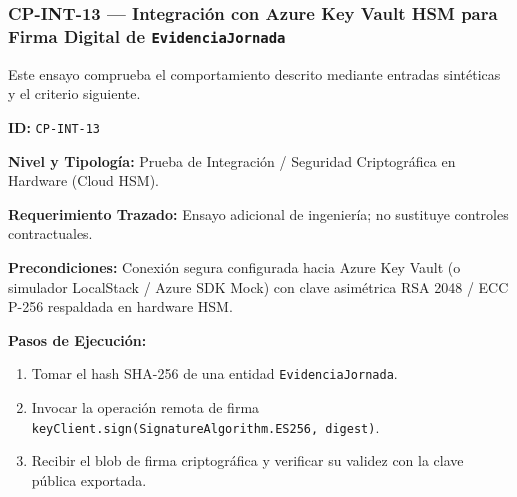 \subsubsection*{CP-INT-13 — Integración con Azure Key Vault HSM para Firma Digital de \texttt{E\allowbreak{}v\allowbreak{}i\allowbreak{}d\allowbreak{}e\allowbreak{}n\allowbreak{}c\allowbreak{}i\allowbreak{}a\allowbreak{}J\allowbreak{}o\allowbreak{}r\allowbreak{}n\allowbreak{}a\allowbreak{}d\allowbreak{}a\allowbreak{}}}\label{sec:9-cp-int-13}
Este ensayo comprueba el comportamiento descrito mediante entradas sintéticas y el criterio siguiente.

\par\noindent\textbf{ID:} \texttt{C\allowbreak{}P\allowbreak{}-\allowbreak{}I\allowbreak{}N\allowbreak{}T\allowbreak{}-\allowbreak{}1\allowbreak{}3\allowbreak{}}\par
\par\noindent\textbf{Nivel y Tipología:} Prueba de Integración / Seguridad Criptográfica en Hardware (Cloud HSM).\par
\par\noindent\textbf{Requerimiento Trazado:} Ensayo adicional de ingeniería; no sustituye controles contractuales.\par
\par\noindent\textbf{Precondiciones:} Conexión segura configurada hacia Azure Key Vault (o simulador LocalStack / Azure SDK Mock) con clave asimétrica RSA 2048 / ECC P-256 respaldada en hardware HSM.\par
\par\noindent\textbf{Pasos de Ejecución:} \par
\begin{enumerate}
\item Tomar el hash SHA-256 de una entidad \texttt{E\allowbreak{}v\allowbreak{}i\allowbreak{}d\allowbreak{}e\allowbreak{}n\allowbreak{}c\allowbreak{}i\allowbreak{}a\allowbreak{}J\allowbreak{}o\allowbreak{}r\allowbreak{}n\allowbreak{}a\allowbreak{}d\allowbreak{}a\allowbreak{}}.
\item Invocar la operación remota de firma \texttt{k\allowbreak{}e\allowbreak{}y\allowbreak{}C\allowbreak{}l\allowbreak{}i\allowbreak{}e\allowbreak{}n\allowbreak{}t\allowbreak{}.\allowbreak{}s\allowbreak{}i\allowbreak{}g\allowbreak{}n\allowbreak{}(\allowbreak{}S\allowbreak{}i\allowbreak{}g\allowbreak{}n\allowbreak{}a\allowbreak{}t\allowbreak{}u\allowbreak{}r\allowbreak{}e\allowbreak{}A\allowbreak{}l\allowbreak{}g\allowbreak{}o\allowbreak{}r\allowbreak{}i\allowbreak{}t\allowbreak{}h\allowbreak{}m\allowbreak{}.\allowbreak{}E\allowbreak{}S\allowbreak{}2\allowbreak{}5\allowbreak{}6\allowbreak{},\allowbreak{} d\allowbreak{}i\allowbreak{}g\allowbreak{}e\allowbreak{}s\allowbreak{}t\allowbreak{})\allowbreak{}}.
\item Recibir el blob de firma criptográfica y verificar su validez con la clave pública exportada.
\end{enumerate}
